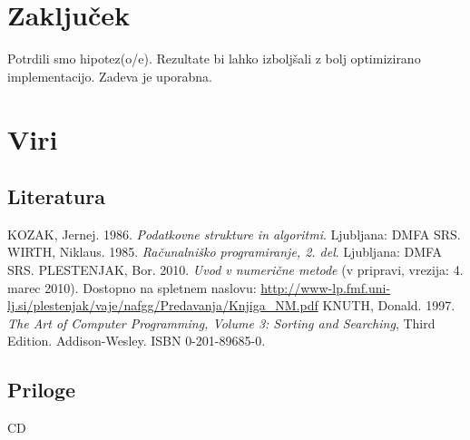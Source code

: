 \documentclass[a4paper,oneside,12pt]{article}
\begin{document}
\section{Zaključek}
Potrdili smo hipotez(o/e). Rezultate bi lahko izboljšali z bolj optimizirano implementacijo.
Zadeva je uporabna.

\pagebreak
\section{Viri}

\subsection{Literatura}
\vspace{-1cm}
\begin{thebibliography}{99}
   {KOZAK, Jernej. 1986. \emph{Podatkovne strukture in algoritmi}. Ljubljana: DMFA SRS. }
   {WIRTH, Niklaus. 1985. \emph{Računalniško programiranje, 2. del}. Ljubljana: DMFA SRS. }
   {PLESTENJAK, Bor. 2010. \emph{Uvod v numerične
    metode} (v pripravi, vrezija: 4. marec 2010).
    Dostopno na spletnem naslovu: \url{http://www-lp.fmf.uni-lj.si/plestenjak/vaje/nafgg/Predavanja/Knjiga_NM.pdf}}
   {KNUTH, Donald. 1997. \emph{The Art of Computer Programming, Volume 3: Sorting and
    Searching}, Third Edition. Addison-Wesley. ISBN 0-201-89685-0.}
\end{thebibliography}

\subsection{Priloge}
CD
\end{document}
